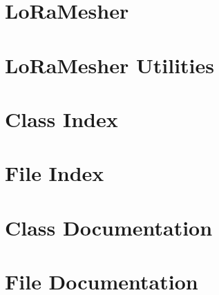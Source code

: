 \documentclass[twoside]{book}
\newcommand{\+}{\discretionary{\mbox{\scriptsize$\hookleftarrow$}}{}{}}
\newcommand{\clearemptydoublepage}{%
    \newpage{\pagestyle{empty}\cleardoublepage}%
  }
\begin{document}
\chapter{Lo\+Ra\+Mesher}
\label{md__c___users_janm2__documents__platform_i_o__projects__gps_and_display__pio_libdeps_ttgo_t_beam__lo_ra_mesher__r_e_a_d_m_e}

\chapter{Lo\+Ra\+Mesher Utilities}
\label{md__c___users_janm2__documents__platform_i_o__projects__gps_and_display__pio_libdeps_ttgo_t_beam80a944ab8f4dfce9525e67ffc2fba38d}

\chapter{Class Index}

\chapter{File Index}

\chapter{Class Documentation}








\chapter{File Documentation}



  \backmatter
  \newpage
  \clearemptydoublepage
  \printindex
\end{document}
